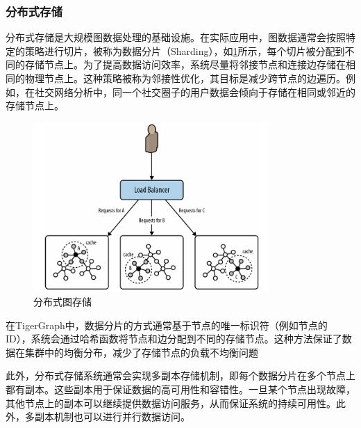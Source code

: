 \subsubsection{分布式存储}
分布式存储是大规模图数据处理的基础设施。在实际应用中，图数据通常会按照特定的策略进行切片，被称为数据分片（Sharding），如\cref{fig:sharding}所示，每个切片被分配到不同的存储节点上。为了提高数据访问效率，系统尽量将邻接节点和连接边存储在相同的物理节点上。这种策略被称为邻接性优化，其目标是减少跨节点的边遍历。例如，在社交网络分析中，同一个社交圈子的用户数据会倾向于存储在相同或邻近的存储节点上。
\begin{figure}
	\centering
	\includegraphics[width=0.8\textwidth]{images/26.png}
	\caption{分布式图存储}
	\label{fig:sharding}
\end{figure}

在TigerGraph中，数据分片的方式通常基于节点的唯一标识符（例如节点的 ID），系统会通过哈希函数将节点和边分配到不同的存储节点。这种方法保证了数据在集群中的均衡分布，减少了存储节点的负载不均衡问题

此外，分布式存储系统通常会实现多副本存储机制，即每个数据分片在多个节点上都有副本。这些副本用于保证数据的高可用性和容错性。一旦某个节点出现故障，其他节点上的副本可以继续提供数据访问服务，从而保证系统的持续可用性。此外，多副本机制也可以进行并行数据访问。

